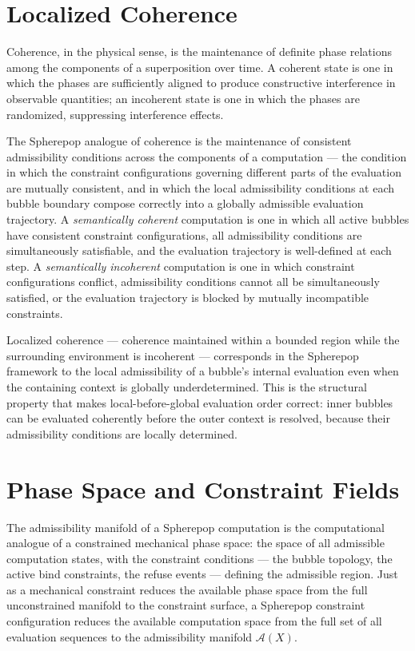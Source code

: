 \documentclass[12pt,openany]{book}
\theoremstyle{plain}
\theoremstyle{definition}
\theoremstyle{remark}
\begin{document}
\section{Localized Coherence}

Coherence, in the physical sense, is the maintenance of definite phase relations among the components of a superposition over time. A coherent state is one in which the phases are sufficiently aligned to produce constructive interference in observable quantities; an incoherent state is one in which the phases are randomized, suppressing interference effects.

The Spherepop analogue of coherence is the maintenance of consistent admissibility conditions across the components of a computation — the condition in which the constraint configurations governing different parts of the evaluation are mutually consistent, and in which the local admissibility conditions at each bubble boundary compose correctly into a globally admissible evaluation trajectory. A \emph{semantically coherent} computation is one in which all active bubbles have consistent constraint configurations, all admissibility conditions are simultaneously satisfiable, and the evaluation trajectory is well-defined at each step. A \emph{semantically incoherent} computation is one in which constraint configurations conflict, admissibility conditions cannot all be simultaneously satisfied, or the evaluation trajectory is blocked by mutually incompatible constraints.

Localized coherence — coherence maintained within a bounded region while the surrounding environment is incoherent — corresponds in the Spherepop framework to the local admissibility of a bubble's internal evaluation even when the containing context is globally underdetermined. This is the structural property that makes local-before-global evaluation order correct: inner bubbles can be evaluated coherently before the outer context is resolved, because their admissibility conditions are locally determined.

\section{Phase Space and Constraint Fields}

The admissibility manifold of a Spherepop computation is the computational analogue of a constrained mechanical phase space: the space of all admissible computation states, with the constraint conditions — the bubble topology, the active bind constraints, the refuse events — defining the admissible region. Just as a mechanical constraint reduces the available phase space from the full unconstrained manifold to the constraint surface, a Spherepop constraint configuration reduces the available computation space from the full set of all evaluation sequences to the admissibility manifold $\mathcal{A}(X)$.
\end{document}
